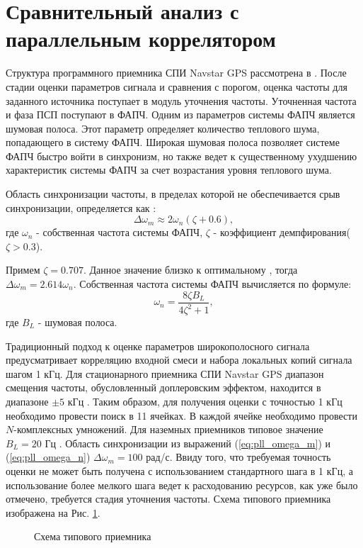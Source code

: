 \section{Сравнительный анализ с параллельным коррелятором}
Структура программного приемника СПИ  Navstar GPS рассмотрена в \cite{tsui}. После стадии оценки параметров сигнала и сравнения с порогом, оценка
частоты для заданного источника поступает в модуль уточнения частоты. Уточненная частота и фаза ПСП поступают в ФАПЧ.
Одним из параметров системы ФАПЧ является шумовая полоса. Этот параметр определяет количество теплового шума, попадающего в систему ФАПЧ.
Широкая шумовая полоса позволяет системе ФАПЧ быстро войти в синхронизм, но также ведет к существенному ухудшению характеристик системы ФАПЧ за счет возрастания уровня теплового шума. 

Область синхронизации частоты, в пределах которой не обеспечивается срыв синхронизации, определяется как \cite{spilker-book}:
\begin{equation}
	\label{eq:pll_omega_m}
	\Delta \omega_m \approx 2 \omega_n (\zeta+0.6),
\end{equation}
где ${\omega_n}$ - собственная частота системы ФАПЧ, ${\zeta}$ - коэффициент демпфирования(${\zeta > 0.3}$).

Примем ${\zeta = 0.707}$. Данное значение   близко к оптимальному \cite{tsui, spilker-book}, тогда ${\Delta \omega_m = 2.614 \omega_n}$.
Собственная частота системы ФАПЧ вычисляется по формуле:
\begin{equation}
	\label{eq:pll_omega_n}
	\omega_n = \frac{8 \zeta B_L}{4 \zeta^2 + 1},
\end{equation}
где ${B_L}$ - шумовая полоса.

Традиционный подход к оценке параметров широкополосного сигнала предусматривает корреляцию входной смеси и набора локальных копий сигнала шагом 1 кГц.
Для стационарного приемника СПИ Navstar GPS диапазон смещения частоты, обусловленный доплеровским эффектом, находится в диапазоне ${\pm 5}$ кГц \cite{tsui, shahtarin_sync}.
Таким образом, для получения оценки с точностью 1 кГц необходимо провести поиск в 11 ячейках. В каждой ячейке необходимо провести ${N}$-комплексных умножений.
Для наземных приемников типовое значение ${B_L=20}$ Гц \cite{tsui}. Область синхронизации из выражений (\ref{eq:pll_omega_m}) и (\ref{eq:pll_omega_n})
${\Delta \omega_m = 100}$ рад/с. Ввиду того, что требуемая точность оценки не может быть получена с использованием стандартного шага в 1 кГц,
а использование более мелкого шага ведет к расходованию ресурсов, как уже было отмечено, требуется стадия уточнения частоты.
Схема типового приемника изображена на Рис. \ref{pic:corr_scheme}.
\begin{figure}[h]
	\center{}
	\caption{Схема типового приемника}
	\label{pic:corr_scheme}
\end{figure}

